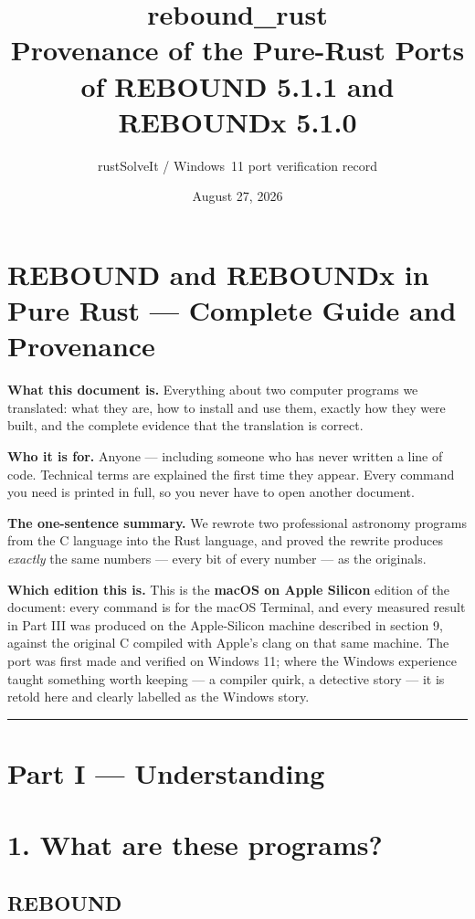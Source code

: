 \documentclass[11pt]{article}
\title{\textbf{rebound\_rust} \\[2pt] \large Provenance of the Pure-Rust Ports of
REBOUND 5.1.1 and REBOUNDx 5.1.0}
\author{rustSolveIt / Windows~11 port verification record}
\date{August 27, 2026}
\begin{document}
\maketitle
\tableofcontents
\clearpage
\section{REBOUND and REBOUNDx in Pure Rust --- Complete Guide and Provenance}

\textbf{What this document is.} Everything about two computer programs we translated: what they are, how to install and use them, exactly how they were built, and the complete evidence that the translation is correct.

\textbf{Who it is for.} Anyone --- including someone who has never written a line of code. Technical terms are explained the first time they appear. Every command you need is printed in full, so you never have to open another document.

\textbf{The one-sentence summary.} We rewrote two professional astronomy programs from the C language into the Rust language, and proved the rewrite produces \emph{exactly} the same numbers --- every bit of every number --- as the originals.

\textbf{Which edition this is.} This is the \textbf{macOS on Apple Silicon} edition of the document: every command is for the macOS Terminal, and every measured result in Part III was produced on the Apple-Silicon machine described in section 9, against the original C compiled with Apple's clang on that same machine. The port was first made and verified on Windows 11; where the Windows experience taught something worth keeping --- a compiler quirk, a detective story --- it is retold here and clearly labelled as the Windows story.

\bigskip\hrule\bigskip

\clearpage
\section*{Part I --- Understanding}

\section{1. What are these programs?}

\subsection{REBOUND}
\end{document}
